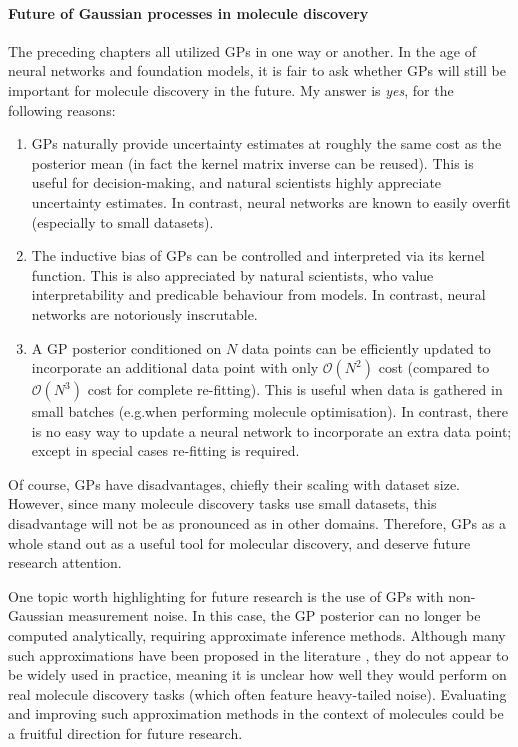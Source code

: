 \paragraph{Future of Gaussian processes in molecule discovery}
The preceding chapters all utilized GPs in one way or another.
In the age of neural networks and foundation models, it is fair to ask
whether GPs will still be important for molecule discovery in the future.
My answer is \emph{yes}, for the following reasons:
\begin{enumerate}
    \item GPs naturally provide uncertainty estimates at roughly the same cost as the posterior mean
        (in fact the kernel matrix inverse can be reused).
        This is useful for decision-making, and natural scientists highly appreciate uncertainty estimates.
        In contrast, neural networks are known to easily overfit (especially to small datasets).
    \item The inductive bias of GPs can be controlled and interpreted via its kernel function.
        This is also appreciated by natural scientists, who value interpretability and predicable behaviour from models.
        In contrast, neural networks are notoriously inscrutable.
    \item A GP posterior conditioned on $N$ data points can be efficiently updated to incorporate an additional data point
        with only $\mathcal O(N^2)$ cost (compared to $\mathcal O(N^3)$ cost for complete re-fitting).
        This is useful when data is gathered in small batches (e.g.\@ when performing molecule optimisation).
        In contrast, there is no easy way to update a neural network to incorporate an extra data point;
        except in special cases re-fitting is required.
\end{enumerate}
Of course, GPs have disadvantages, chiefly their scaling with dataset size.
However, since many molecule discovery tasks use small datasets,
this disadvantage will not be as pronounced as in other domains.
Therefore, GPs as a whole stand out as a useful tool for molecular discovery,
and deserve future research attention.

One topic worth highlighting for future research is the use of GPs
with non-Gaussian measurement noise.
In this case, the GP posterior can no longer be computed analytically,
requiring approximate inference methods.
Although many such approximations have been proposed in the literature \citep{hensman2013gaussian},
they do not appear to be widely used in practice,
meaning it is unclear how well they would perform on real molecule discovery tasks (which often feature heavy-tailed noise).
Evaluating and improving such approximation methods in the context of molecules
could be a fruitful direction for future research.

